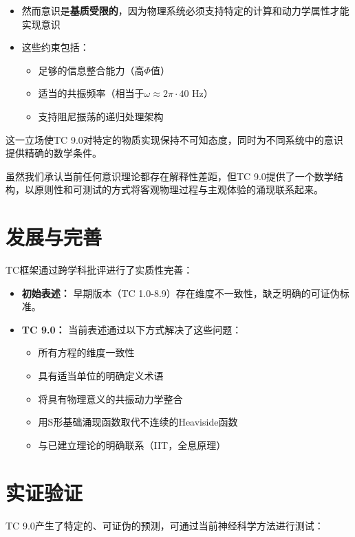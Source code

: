 \documentclass[12pt]{article}
\begin{document}
\begin{CJK}{UTF8}{gbsn}
\begin{itemize}
    \item 然而意识是\textbf{基质受限的}，因为物理系统必须支持特定的计算和动力学属性才能实现意识
    
    \item 这些约束包括：
    \begin{itemize}[label=--]
        \item 足够的信息整合能力（高$\Phi$值）
        \item 适当的共振频率（相当于$\omega \approx 2\pi \cdot 40$ Hz）
        \item 支持阻尼振荡的递归处理架构
    \end{itemize}
\end{itemize}

这一立场使TC 9.0对特定的物质实现保持不可知态度，同时为不同系统中的意识提供精确的数学条件。

虽然我们承认当前任何意识理论都存在解释性差距，但TC 9.0提供了一个数学结构，以原则性和可测试的方式将客观物理过程与主观体验的涌现联系起来。

\section{发展与完善}
TC框架通过跨学科批评进行了实质性完善：

\begin{itemize}
    \item \textbf{初始表述：} 早期版本（TC 1.0-8.9）存在维度不一致性，缺乏明确的可证伪标准。
    
    \item \textbf{TC 9.0：} 当前表述通过以下方式解决了这些问题：
    \begin{itemize}[label=--]
        \item 所有方程的维度一致性
        \item 具有适当单位的明确定义术语
        \item 将具有物理意义的共振动力学整合
        \item 用S形基础涌现函数取代不连续的Heaviside函数
        \item 与已建立理论的明确联系（IIT，全息原理）
    \end{itemize}
\end{itemize}

\section{实证验证}
TC 9.0产生了特定的、可证伪的预测，可通过当前神经科学方法进行测试：


\end{CJK}
\end{document}
